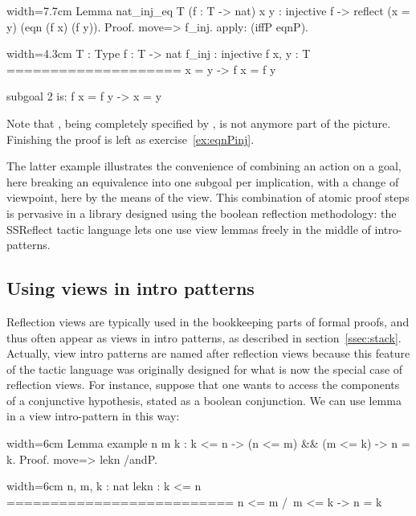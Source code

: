 \begin{coq-left}{}{width=7.7cm}
Lemma nat_inj_eq T (f : T -> nat) x y :
  injective f ->
    reflect (x = y) (eqn (f x) (f y)).
Proof.
move=> f_inj.
apply: (iffP eqnP).
$~$
$~$
$~$
\end{coq-left}
\begin{coqout-right}{}{width=4.3cm}
T : Type
f : T -> nat
f_inj : injective f
x, y : T
====================
x = y -> f x = f y

subgoal 2 is:
 f x = f y -> x = y
\end{coqout-right}

Note that , being completely specified by , is not
anymore part of the picture.  Finishing the proof is left as
exercise~\ref{ex:eqnPinj}.

The latter example illustrates the convenience of combining an action
on a goal, here breaking an equivalence into one subgoal per
implication, with a change of viewpoint, here by the means of the
 view. This combination of atomic proof steps is pervasive in
a library designed using the boolean reflection methodology: the
SSReflect tactic language lets one use view lemmas freely
in the middle of intro-patterns.

\subsection{Using views in intro patterns}

Reflection views are typically used in the bookkeeping parts of formal
proofs, and thus often appear as views in intro patterns, as described
in section~\ref{ssec:stack}. Actually, view intro patterns are named
after reflection views because this feature of the tactic language was
originally designed for what is now the special case of reflection
views. For instance, suppose
that one wants to access the components of a conjunctive hypothesis,
stated as a boolean conjunction. We can use lemma  in a view
intro-pattern in this way:

\begin{coq-left}{}{width=6cm}
Lemma example n m k : k <= n ->
  (n <= m) && (m <= k) -> n = k.
Proof.
move=> lekn /andP.
\end{coq-left}
\begin{coqout-right}{}{width=6cm}
n, m, k : nat
lekn : k <= n
==========================
 n <= m /\ m <= k -> n = k
\end{coqout-right}

